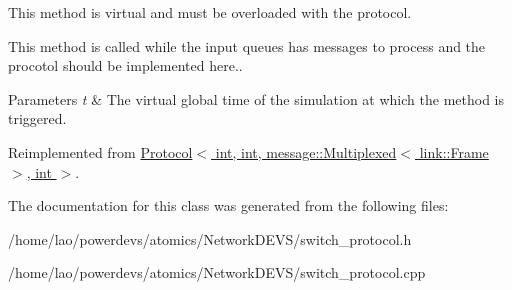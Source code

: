 This method is virtual and must be overloaded with the protocol. 

This method is called while the input queues has messages to process and the procotol should be implemented here..


\begin{DoxyParams}{Parameters}
{\em t} & The virtual global time of the simulation at which the method is triggered. \\
\hline
\end{DoxyParams}


Reimplemented from \hyperlink{classProtocol_a9c6247fa4ea8524d1214fca4cacbd781}{Protocol$<$ int, int, message\+::\+Multiplexed$<$ link\+::\+Frame $>$, int $>$}.



The documentation for this class was generated from the following files\+:\begin{DoxyCompactItemize}
\item 
/home/lao/powerdevs/atomics/\+Network\+D\+E\+V\+S/switch\+\_\+protocol.\+h\item 
/home/lao/powerdevs/atomics/\+Network\+D\+E\+V\+S/switch\+\_\+protocol.\+cpp\end{DoxyCompactItemize}
